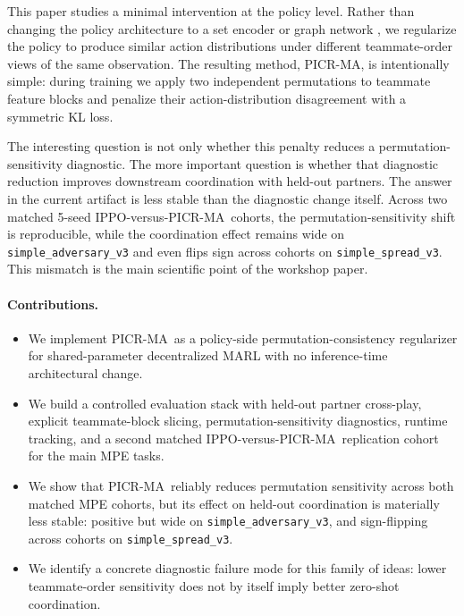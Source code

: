 \documentclass{article}
\newcommand{\method}{PICR-MA}
\begin{document}
This paper studies a minimal intervention at the policy level. Rather than changing the policy architecture to a set encoder or graph network \citep{zaheer2017deepsets, liu2020pic}, we regularize the policy to produce similar action distributions under different teammate-order views of the same observation. The resulting method, \method, is intentionally simple: during training we apply two independent permutations to teammate feature blocks and penalize their action-distribution disagreement with a symmetric KL loss.

The interesting question is not only whether this penalty reduces a permutation-sensitivity diagnostic. The more important question is whether that diagnostic reduction improves downstream coordination with held-out partners. The answer in the current artifact is less stable than the diagnostic change itself. Across two matched 5-seed IPPO-versus-\method\ cohorts, the permutation-sensitivity shift is reproducible, while the coordination effect remains wide on \texttt{simple\_adversary\_v3} and even flips sign across cohorts on \texttt{simple\_spread\_v3}. This mismatch is the main scientific point of the workshop paper.

\paragraph{Contributions.}
\begin{itemize}[leftmargin=1.3em]
\item We implement \method\ as a policy-side permutation-consistency regularizer for shared-parameter decentralized MARL with no inference-time architectural change.
\item We build a controlled evaluation stack with held-out partner cross-play, explicit teammate-block slicing, permutation-sensitivity diagnostics, runtime tracking, and a second matched IPPO-versus-\method\ replication cohort for the main MPE tasks.
\item We show that \method\ reliably reduces permutation sensitivity across both matched MPE cohorts, but its effect on held-out coordination is materially less stable: positive but wide on \texttt{simple\_adversary\_v3}, and sign-flipping across cohorts on \texttt{simple\_spread\_v3}.
\item We identify a concrete diagnostic failure mode for this family of ideas: lower teammate-order sensitivity does not by itself imply better zero-shot coordination.
\end{itemize}
\end{document}

